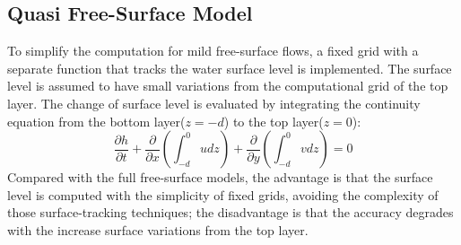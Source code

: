 \subsection*{Quasi Free-Surface Model}
To simplify the computation for mild free-surface flows, a fixed grid with a separate function that tracks the water surface level is implemented. The surface level is assumed to have small variations from the computational grid of the top layer. The change of surface level is evaluated by integrating the continuity equation from the bottom layer($z=-d$) to the top layer($z=0$):
\begin{equation}
\frac{\partial h}{\partial t}+\frac{\partial}{\partial
x}(\int^{0}_{-d} udz)+\frac{\partial}{\partial y}(\int^{0}_{-d}
vdz)=0 \label{continuity-surface}
\end{equation}
Compared with the full free-surface models, the advantage is that the surface level is computed with the simplicity of fixed grids, avoiding the complexity of those surface-tracking techniques; the disadvantage is that the accuracy degrades with the increase surface variations from the top layer.

%


